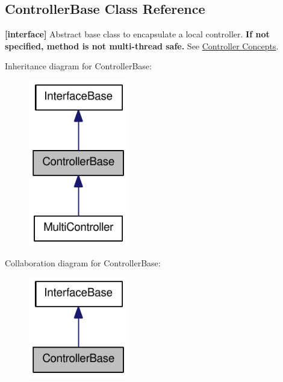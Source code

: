 \hypertarget{classOpenRAVE_1_1ControllerBase}{
\subsection{ControllerBase Class Reference}
\label{classOpenRAVE_1_1ControllerBase}
}


{\bfseries \mbox{[}interface\mbox{]}} Abstract base class to encapsulate a local controller. {\bfseries If not specified, method is not multi-\/thread safe.} See \hyperlink{arch__controller}{Controller Concepts}.  




Inheritance diagram for ControllerBase:\nopagebreak
\begin{figure}[H]
\begin{center}
\leavevmode
\includegraphics[width=124pt]{classOpenRAVE_1_1ControllerBase__inherit__graph}
\end{center}
\end{figure}


Collaboration diagram for ControllerBase:\nopagebreak
\begin{figure}[H]
\begin{center}
\leavevmode
\includegraphics[width=124pt]{classOpenRAVE_1_1ControllerBase__coll__graph}
\end{center}
\end{figure}
